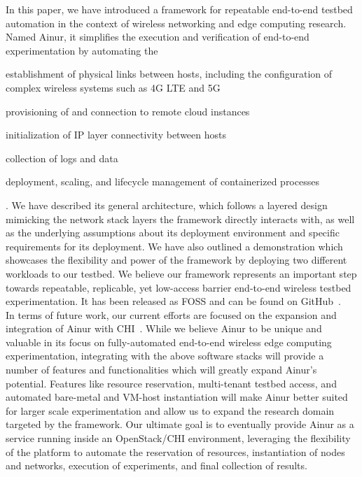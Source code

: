 In this paper, we have introduced a framework for repeatable end-to-end testbed automation in the context of wireless networking and edge computing research.
Named Ainur, it simplifies the execution and verification of end-to-end experimentation by automating the
\begin{enumerate*}[itemjoin={{; }}, itemjoin*={{; and }}]
    \item establishment of physical links between hosts, including the configuration of complex wireless systems such as 4G \ac{LTE} and 5G
    \item provisioning of and connection to remote cloud instances
    \item initialization of \ac{IP} layer connectivity between hosts
    \item collection of logs and data
    \item deployment, scaling, and lifecycle management of containerized processes
\end{enumerate*}.
We have described its general architecture, which follows a layered design mimicking the network stack layers the framework directly interacts with, as well as the underlying assumptions about its deployment environment and specific requirements for its deployment.
We have also outlined a demonstration which showcases the flexibility and power of the framework by deploying two different workloads to our testbed.
We believe our framework represents an important step towards repeatable, replicable, yet low-access barrier end-to-end wireless testbed experimentation.
It has been released as \ac{FOSS} and can be found on GitHub~\cite{ainur:github}.\\

In terms of future work, our current efforts are focused on the expansion and integration of Ainur with \ac{CHI}~\cite{keahey2020lessons}.
While we believe Ainur to be unique and valuable in its focus on fully-automated end-to-end wireless edge computing experimentation, integrating with the above software stacks will provide a number of features and functionalities which will greatly expand Ainur's potential.
Features like resource reservation, multi-tenant testbed access, and automated bare-metal and \ac{VM}-host instantiation will make Ainur better suited for larger scale experimentation and allow us to expand the research domain targeted by the framework.
Our ultimate goal is to eventually provide Ainur as a service running inside an OpenStack/\ac{CHI} environment, leveraging the flexibility of the platform to automate the reservation of resources, instantiation of nodes and networks, execution of experiments, and final collection of results.


